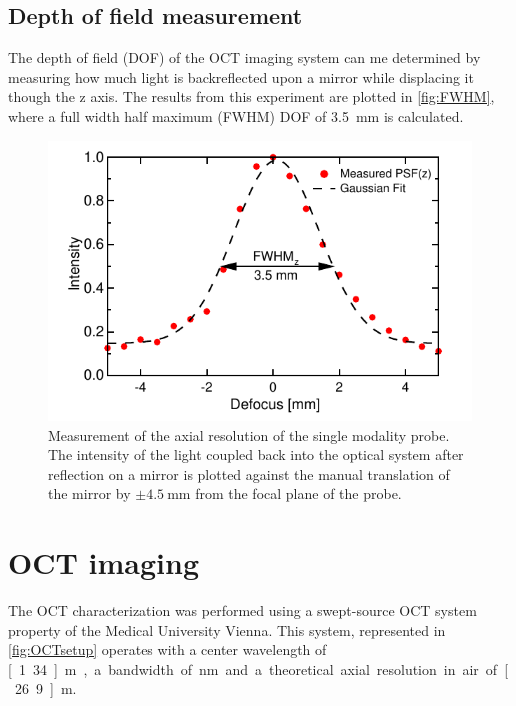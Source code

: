 \subsection{Depth of field measurement}
The depth of field (DOF) of the OCT imaging system can me determined by measuring how much light is backreflected upon a mirror while displacing it though the z axis. The results from this experiment are plotted in \autoref{fig:FWHM}, where a full width half maximum (FWHM) DOF of \SI{3.5}{\milli\meter} is calculated. 

\begin{figure}[h!]\centering \includegraphics{figures/50_Measurements/conf/res/PSFz.pdf}
      \caption{Measurement of the axial resolution of the single modality probe. The intensity of the light coupled back into the optical system after reflection on a mirror is plotted against the manual translation of the mirror by $\pm \SI{4.5}{\milli\meter}$ from the focal plane of the probe. }
      \label{fig:FWHM}
\end{figure}




\clearpage
\section{OCT imaging}

The OCT characterization was performed using a swept-source OCT system property of the Medical University Vienna. This system, represented in \autoref{fig:OCTsetup} operates with a center wavelength of \unit[1.34]{\textmu m}, a bandwidth of \unit[37]{nm} and a theoretical axial resolution in air of \unit[26.9]{\textmu m}.

